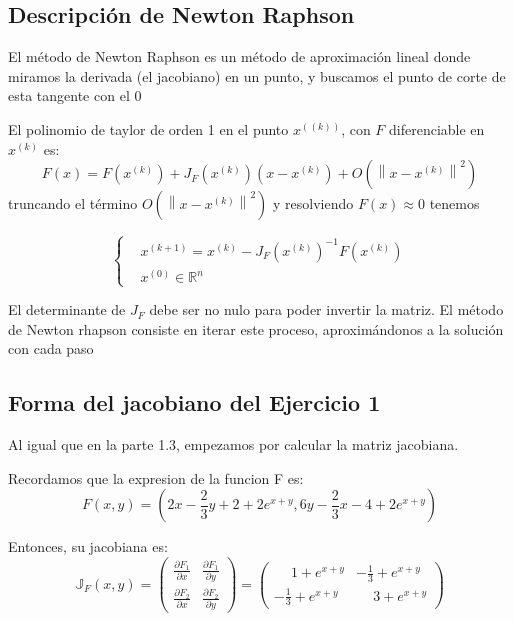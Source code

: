 \documentclass{endm}
\begin{document}
\subsection{Descripción de Newton Raphson}
El método de Newton Raphson es un método de aproximación lineal donde miramos la derivada (el jacobiano) en un punto, y buscamos el punto de corte de esta tangente con el 0

El polinomio de taylor de orden 1 en el punto $x^((k))$, con $F$ diferenciable en $x^{(k)}$ es:
\begin{equation*}
F(x) = F(x^{(k)}) + J_F(x^{(k)})(x-x^{(k)})+O(\left \| x-x^{(k)} \right \|^2)
\end{equation*}
truncando el término $O(\left \| x-x^{(k)} \right \|^2)$ y resolviendo $F(x) \approx  0$ tenemos

\begin{equation}
\begin{cases}
 & x^{(k+1)} = x^{(k)} - J_F(x^{(k)})^{-1} F(x^{(k)}) \\
 & x^{(0)}  \in \mathbb{R}^n
\end{cases}
\end{equation}

El determinante de $J_F$ debe ser no nulo para poder invertir la matriz.
El método de Newton rhapson consiste en iterar este proceso, aproximándonos a la solución con cada paso

\subsection{Forma del jacobiano del Ejercicio 1}
Al igual que en la parte 1.3, empezamos por calcular la matriz jacobiana.
    
    Recordamos que la expresion de la funcion F es:
    \begin{equation*}
        F(x,y) = \left( 2x - \frac{2}{3}y + 2 + 2e^{x+y}, 6y - \frac{2}{3}x - 4 + 2e^{x+y} \right)
    \end{equation*}

    Entonces, su jacobiana es:
    \begin{equation}
        \mathbb{J}_F(x,y) =
        \begin{pmatrix}
            \frac{\partial F_1}{\partial x} & \frac{\partial F_1}{\partial y} \\
            \frac{\partial F_2}{\partial x} & \frac{\partial F_2}{\partial y}
        \end{pmatrix}
        =
        \begin{pmatrix}
            \phantom{-}1 + e^{x+y} & -\frac{1}{3} + e^{x+y} \\
            -\frac{1}{3} + e^{x+y} & \phantom{-}3 + e^{x+y}
        \end{pmatrix}
    \end{equation}
\end{document}
